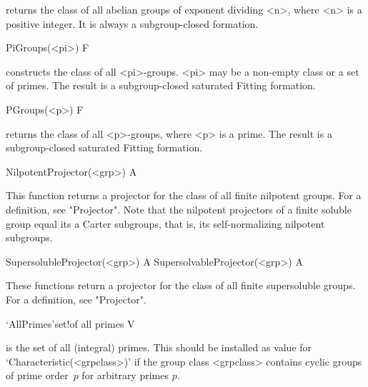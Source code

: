 \relax
{}\relax
returns the class of all abelian groups of exponent dividing <n>, 
where <n> is
a positive integer. It is always a subgroup-closed formation.


\>PiGroups(<pi>) F

\relax
constructs the class of all <pi>-groups.  <pi> may be a non-empty class or a
set of primes. The result is a subgroup-closed saturated Fitting formation.


\>PGroups(<p>) F

\relax
returns the class of all <p>-groups, where <p> is a prime.  The result is a
subgroup-closed saturated Fitting formation.

\null

\>NilpotentProjector(<grp>) A

\relax
This function returns a projector for the class of all finite nilpotent
groups. For a definition, see "Projector". Note that the nilpotent projectors
of a finite soluble group equal its a Carter subgroups, that is, its
self-normalizing nilpotent subgroups. 

\>SupersolubleProjector(<grp>) A
\>SupersolvableProjector(<grp>) A

These functions return a projector for the class of all finite supersoluble
groups. For a definition, see "Projector". 

\null

\>`AllPrimes'{set}!{of all primes} V

\relax
\label{AllPrimes}\relax
is the set of all (integral) primes. This should be
installed as value for `Characteristic(<grpclass>)' if the group class
<grpclass> contains cyclic groups of prime order~$p$ for arbitrary primes $p$.



